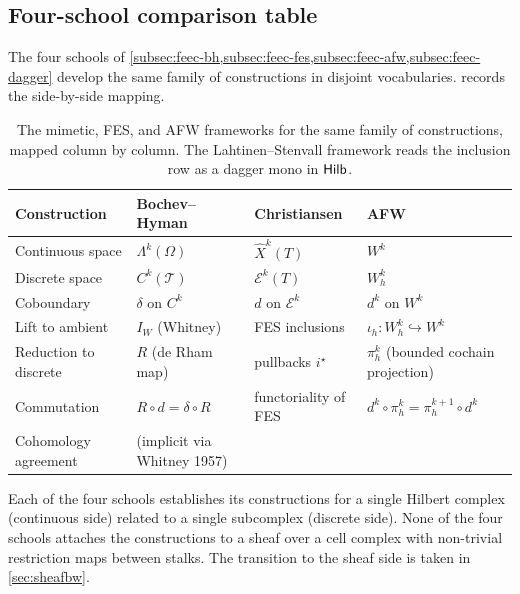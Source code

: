\subsection{Four-school comparison table}\label{subsec:feec-comparison}

The four schools of \cref{subsec:feec-bh,subsec:feec-fes,subsec:feec-afw,subsec:feec-dagger}
develop the same family of constructions in disjoint vocabularies.
 records the side-by-side mapping.

\begin{table}[h]
  \centering
  \small
  \begin{tabular}{@{}llll@{}}
    \toprule
    Construction & Bochev--Hyman \cite{BochevHyman2006} &
       Christiansen \cite{Christiansen2010} &
       AFW \cite{AFW2010} \\
    \midrule
    Continuous space &
       $\Lambda^k(\Omega)$ & $\widehat{X}^k(T)$ & $W^k$ \\
    Discrete space &
       $C^k(\mathcal{T})$ & $\mathcal{E}^k(T)$ & $W_h^k$ \\
    Coboundary & $\delta$ on $C^k$ & $d$ on $\mathcal{E}^k$ &
       $d^k$ on $W^k$ \\
    Lift to ambient &
       $I_W$ (Whitney) & FES inclusions \cite[Ex.~2.3]{Christiansen2010} &
       $\iota_h : W_h^k \hookrightarrow W^k$ \\
    Reduction to discrete &
       $R$ (de Rham map) & pullbacks $i^\star$ & $\pi_h^k$
       (bounded cochain projection) \\
    Commutation &
       $R \circ d = \delta \circ R$ & functoriality of FES &
       $d^k \circ \pi_h^k = \pi_h^{k+1} \circ d^k$ \\
    Cohomology agreement &
       (implicit via Whitney 1957) & \cite[Prop.~2.10]{Christiansen2010} &
       \cite[Thm.~3.6]{AFW2010} \\
    \bottomrule
  \end{tabular}
  \caption{The mimetic, FES, and AFW frameworks for the
    same family of constructions, mapped column by column. The
    Lahtinen--Stenvall framework \cite{LahtinenStenvall2020} reads
    the inclusion row as a dagger mono in
    $\mathsf{Hilb}$.}\label{tab:feec-four-schools}
\end{table}

\begin{remark}\label{rem:feec-scope}
Each of the four schools establishes its constructions for a single
Hilbert complex (continuous side) related to a single subcomplex
(discrete side). None of the four schools attaches the constructions
to a sheaf over a cell complex with non-trivial restriction maps
between stalks. The transition to the sheaf side is taken in
\cref{sec:sheafbw}.
\end{remark}

